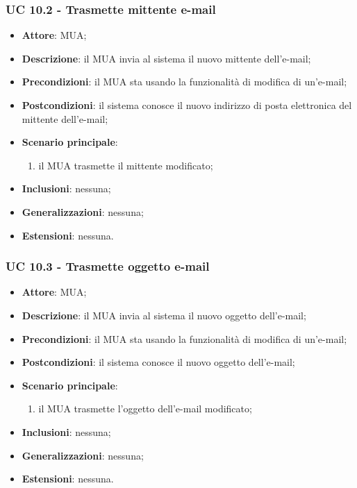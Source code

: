     \subsubsection{UC 10.2 - Trasmette mittente e-mail} \label{sec:UC10.2}
    \begin{itemize}
        \item \textbf{Attore}: MUA;
        \item \textbf{Descrizione}: il MUA invia al sistema il nuovo mittente dell'e-mail;
        \item \textbf{Precondizioni}: il MUA sta usando la funzionalità di modifica di un'e-mail;
        \item \textbf{Postcondizioni}: il sistema conosce il nuovo indirizzo di posta elettronica del mittente dell'e-mail;
        \item \textbf{Scenario principale}:
            \begin{enumerate}
                \item il MUA trasmette il mittente modificato;
            \end{enumerate}
        \item \textbf{Inclusioni}: nessuna;
        \item \textbf{Generalizzazioni}: nessuna;
        \item \textbf{Estensioni}: nessuna.
    \end{itemize}

    \subsubsection{UC 10.3 - Trasmette oggetto e-mail} \label{sec:UC10.3}
    \begin{itemize}
        \item \textbf{Attore}: MUA;
        \item \textbf{Descrizione}: il MUA invia al sistema il nuovo oggetto dell'e-mail;
        \item \textbf{Precondizioni}: il MUA sta usando la funzionalità di modifica di un'e-mail;
        \item \textbf{Postcondizioni}: il sistema conosce il nuovo oggetto dell'e-mail;
        \item \textbf{Scenario principale}:
            \begin{enumerate}
                \item il MUA trasmette l'oggetto dell'e-mail modificato;
            \end{enumerate}
        \item \textbf{Inclusioni}: nessuna;
        \item \textbf{Generalizzazioni}: nessuna;
        \item \textbf{Estensioni}: nessuna.
    \end{itemize}

